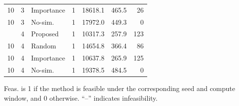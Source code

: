 \begin{table}[t]
\begin{tabular}{cc l c r r r}
10 & 3 & Importance & 1 & 18618.1 & 465.5 & 26 \\
10 & 3 & No-sim. & 1 & 17972.0 & 449.3 & 0 \\
\addlinespace[1pt]
10 & 4 & Proposed & 1 & 10317.3 & 257.9 & 123 \\
10 & 4 & Random & 1 & 14654.8 & 366.4 & 86 \\
10 & 4 & Importance & 1 & 10637.8 & 265.9 & 125 \\
10 & 4 & No-sim. & 1 & 19378.5 & 484.5 & 0 \\
\bottomrule
\end{tabular}
\vspace{2pt}
\begin{flushleft}
\footnotesize Feas. is 1 if the method is feasible under the corresponding seed and compute window, and 0 otherwise. ``--'' indicates infeasibility.
\end{flushleft}
\end{table}
